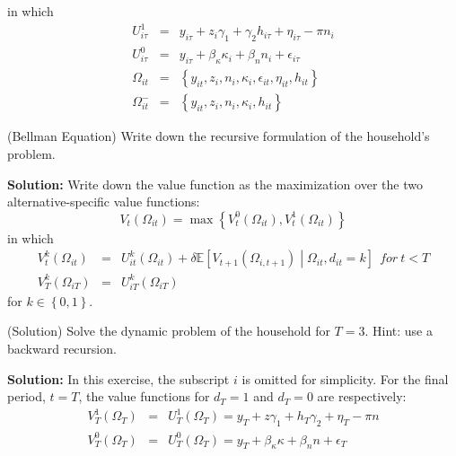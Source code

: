\noindent in which
\begin{eqnarray*}
U^{1}_{i\tau} &=& y_{i\tau} + z_{i}\gamma_{1} + \gamma_{2}h_{i\tau} + \eta_{i\tau} - \pi n_{i}\\
U^{0}_{i\tau} &=& y_{i\tau} + \beta_{\kappa}\kappa_{i} + \beta_{n}n_{i} + \epsilon_{i\tau}\\
\Omega_{it} &=& \left\{ y_{it}, z_{i}, n_{i}, \kappa_{i}, \epsilon_{it}, \eta_{it}, h_{it}\right\}\\
\Omega_{it}^- &=& \left\{ y_{it}, z_{i}, n_{i}, \kappa_{i}, h_{it}\right\}
\end{eqnarray*}

\begin{exercise} (Bellman Equation)
Write down the recursive formulation of the household's problem.
\end{exercise}

\noindent\textbf{Solution:}
Write down the value function as the maximization over the two alternative-specific value functions:
\begin{equation*}
V_t\left(\Omega_{it}\right) = \max \left\{V^{0}_{t} \left(\Omega_{it} \right),V^{1}_{t} \left(\Omega_{it} \right)\right\}
\end{equation*}
\noindent in which
\begin{eqnarray*}
V^{k}_t\left(\Omega_{it}\right) &=& U^{k}_{it}\left(\Omega_{it}\right) + \delta \mathbb{E} \left[V_{t+1}\left(\Omega_{i,t+1} \right) \middle| \Omega_{it}, d_{it} = k \right]\ \ for\ t<T\\
V^{k}_{T} \left(\Omega_{iT}\right) &=& U^{k}_{iT}\left(\Omega_{iT}\right)
\end{eqnarray*}
for $k \in \left\{0,1\right\}$.

\begin{exercise} (Solution)
Solve the dynamic problem of the household for $T=3$. Hint: use a backward recursion.
\end{exercise}

\noindent\textbf{Solution:}
\noindent In this exercise, the subscript $i$ is omitted for simplicity. For the final period, $t = T$, the value functions for $d_{T}=1$ and $d_{T}=0$ are respectively:\\
\begin{eqnarray*}
V^{1}_{T}\left(\Omega_{T}\right) &=& U^{1}_{T}\left(\Omega_{T}\right) = y_{T} + z\gamma_1 + h_{T}\gamma_2 + \eta_{T} - \pi n\\
V^{0}_{T}\left(\Omega_{T}\right) &=& U^{0}_{T}\left(\Omega_{T}\right) = y_{T} + \beta_\kappa \kappa + \beta_n n + \epsilon_T
\end{eqnarray*}

